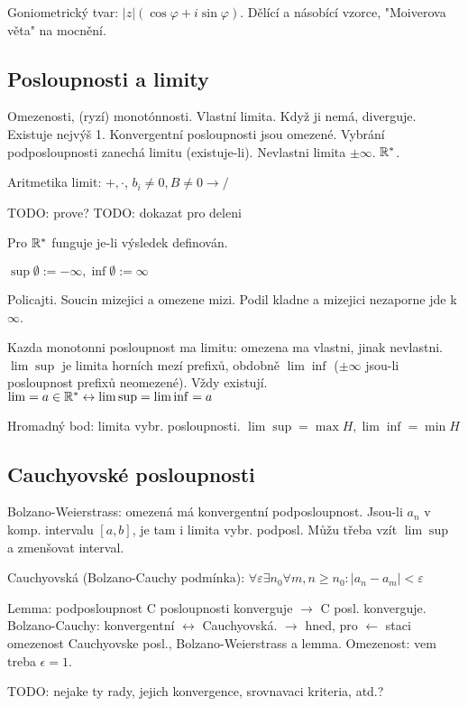 Goniometrický tvar: $|z|(\cos\varphi+i\sin\varphi)$. Dělící a násobící vzorce,
"Moiverova věta" na mocnění.

\subsection{Posloupnosti a limity}
Omezenosti, (ryzí) monotónnosti.
Vlastní limita. Když ji nemá, diverguje. Existuje nejvýš 1.
Konvergentní posloupnosti jsou omezené.
Vybrání podposloupnosti zanechá limitu (existuje-li).
Nevlastni limita $\pm\infty$. $\mathbb{R}^*$.

Aritmetika limit: $+,\cdot$, $b_i\neq 0,B\neq 0\rightarrow/$

TODO: prove?
TODO: dokazat pro deleni

Pro $\mathbb{R}^*$ funguje je-li výsledek definován.

$\sup\emptyset:=-\infty,\inf\emptyset:=\infty$

Policajti. Soucin mizejici a omezene mizi.
Podil kladne a mizejici nezaporne jde k $\infty$.

Kazda monotonni posloupnost ma limitu: omezena ma vlastni, jinak nevlastni.
$\lim\sup$ je limita horních mezí prefixů, obdobně $\lim\inf$ ($\pm\infty$
jsou-li posloupnost prefixů neomezené). Vždy existují.
$\lim=a\in\mathbb{R}^*\leftrightarrow\lim\sup=\lim\inf=a$

Hromadný bod: limita vybr. posloupnosti. $\lim\sup=\max H,\lim\inf=\min H$

\subsection{Cauchyovské posloupnosti}
Bolzano-Weierstrass: omezená má konvergentní podposloupnost.
Jsou-li $a_n$ v komp. intervalu $[a,b]$, je tam i limita vybr. podposl.
Můžu třeba vzít $\lim\sup$ a zmenšovat interval.

Cauchyovská (Bolzano-Cauchy podmínka):
$\forall\varepsilon\exists n_0\forall m,n\geq n_0: |a_n-a_m|<\varepsilon$

Lemma: podposloupnost C posloupnosti konverguje $\rightarrow$ C posl.
konverguje.
Bolzano-Cauchy: konvergentní $\leftrightarrow$ Cauchyovská. $\rightarrow$
hned, pro $\leftarrow$ staci omezenost Cauchyovske posl., Bolzano-Weierstrass
a lemma. Omezenost: vem treba $\epsilon=1$.

TODO: nejake ty rady, jejich konvergence, srovnavaci kriteria, atd.?
